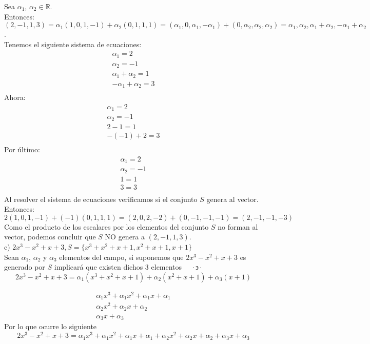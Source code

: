 \documentclass[letterpaper]{article}
\newcommand{\tq}{ \quad \cdot  \backepsilon \cdot \quad }
\renewcommand{\*}{\cdot}
\theoremstyle{definition}
\begin{document}
Sea $\alpha _1$, $\alpha _2 \in \mathbb{R}$.\\
Entonces: $(2,-1,1,3)=\alpha_{1}(1,0,1,-1)+\alpha_{2}(0,1,1,1)= (\alpha_{1},0,\alpha_{1},-\alpha_{1})+(0,\alpha_{2},\alpha_{2},\alpha_{2})= \alpha_{1},\alpha_{2},\alpha_{1}+\alpha_{2},-\alpha_{1}+\alpha_{2}$.\\
Tenemos el siguiente sistema de ecuaciones:\\
\begin{eqnarray*}
\alpha_{1}=2\\
\alpha_{2} = -1\\
\alpha_{1}+\alpha_{2}=1\\
-\alpha_{1}+\alpha_{2}=3\\
\end{eqnarray*}
Ahora:\\
\begin{eqnarray*}
\alpha_{1}=2\\
\alpha_{2}= -1\\
2-1  =1\\
-(-1)+2 = 3\\
\end{eqnarray*}
Por último:
\begin{eqnarray*}
\alpha_{1}=2\\
\alpha_{2}=-1\\
1=1\\
3=3\\
\end{eqnarray*}
Al resolver el sistema de ecuaciones verificamos si el conjunto $S$ genera al vector. Entonces:
\[2(1,0,1,-1)+(-1)(0,1,1,1)=(2,0,2,-2)+(0,-1,-1,-1)=(2,-1,-1,-3)\]
Como el producto de los escalares por los elementos del conjunto $S$ no forman al vector, podemos concluir que $S$ NO genera a $(2,-1,1,3)$.\\

c) $2x^3 - x^2 + x + 3, S =  \lbrace x^3 + x^2 + x +1, x^2 + x +1, x +1 \rbrace$\\

Sean $\alpha_1 $, $\alpha_2$ y $\alpha_3$ elementos del campo, si suponemos que $2x^3 - x^2 + x + 3$ es generado por $S$ implicará que existen dichos 3 elementos $\tq$ 
\[ 2x^3 - x^2 + x + 3 = \alpha_1 (x^3 + x^2 + x +1) + \alpha_2 (x^2 + x +1) + \alpha_3 (x +1) \]

\begin{eqnarray}
	\alpha_1 x^3 + \alpha_1 x^2 + \alpha_1 x + \alpha_1 	\\
	\alpha_2 x^2 + \alpha_2 x + \alpha_2 \\
	\alpha_3 x + \alpha_3 
\end{eqnarray}
Por lo que ocurre lo siguiente
\[ 2x^3 - x^2 + x + 3 = \alpha_1 x^3 + \alpha_1 x^2 + \alpha_1 x + \alpha_1 + \alpha_2 x^2 + \alpha_2 x + \alpha_2 +\alpha_3 x + \alpha_3  \]
\end{document}
